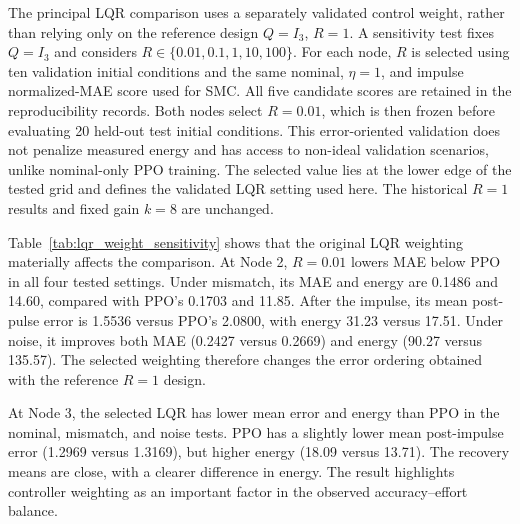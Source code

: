 
The principal LQR comparison uses a separately validated control weight, rather than relying only on the reference design $Q=I_3$, $R=1$. A sensitivity test fixes $Q=I_3$ and considers $R\in\{0.01,0.1,1,10,100\}$. For each node, $R$ is selected using ten validation initial conditions and the same nominal, $\eta=1$, and impulse normalized-MAE score used for SMC. All five candidate scores are retained in the reproducibility records. Both nodes select $R=0.01$, which is then frozen before evaluating 20 held-out test initial conditions. This error-oriented validation does not penalize measured energy and has access to non-ideal validation scenarios, unlike nominal-only PPO training. The selected value lies at the lower edge of the tested grid and defines the validated LQR setting used here. The historical $R=1$ results and fixed gain $k=8$ are unchanged.



Table~\ref{tab:lqr_weight_sensitivity} shows that the original LQR weighting materially affects the comparison. At Node 2, $R=0.01$ lowers MAE below PPO in all four tested settings. Under mismatch, its MAE and energy are 0.1486 and 14.60, compared with PPO's 0.1703 and 11.85. After the impulse, its mean post-pulse error is 1.5536 versus PPO's 2.0800, with energy 31.23 versus 17.51. Under noise, it improves both MAE (0.2427 versus 0.2669) and energy (90.27 versus 135.57). The selected weighting therefore changes the error ordering obtained with the reference $R=1$ design.

At Node 3, the selected LQR has lower mean error and energy than PPO in the nominal, mismatch, and noise tests. PPO has a slightly lower mean post-impulse error (1.2969 versus 1.3169), but higher energy (18.09 versus 13.71). The recovery means are close, with a clearer difference in energy. The result highlights controller weighting as an important factor in the observed accuracy--effort balance.
